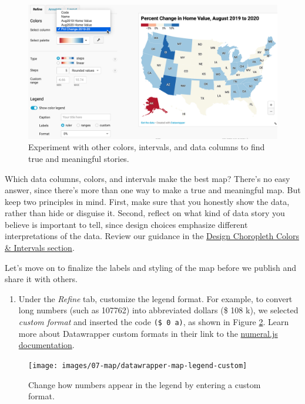 \documentclass[
  english,
]{book}
\providecommand{\tightlist}{%
  \setlength{\itemsep}{0pt}\setlength{\parskip}{0pt}}
\begin{document}
\begin{figure}
\includegraphics[width=650px]{images/07-map/datawrapper-map-percentchange} \caption{Experiment with other colors, intervals, and data columns to find true and meaningful stories.}\label{fig:datawrapper-map-percentchange}
\end{figure}

Which data columns, colors, and intervals make the best map? There's no easy answer, since there's more than one way to make a true and meaningful map. But keep two principles in mind. First, make sure that you honestly show the data, rather than hide or disguise it. Second, reflect on what kind of data story you believe is important to tell, since design choices emphasize different interpretations of the data. Review our guidance in the \href{design-choropleth.html}{Design Choropleth Colors \& Intervals section}.

Let's move on to finalize the labels and styling of the map before we publish and share it with others.

\begin{enumerate}
\def\labelenumi{\arabic{enumi}.}
\setcounter{enumi}{11}
\tightlist
\item
  Under the \emph{Refine} tab, customize the legend format. For example, to convert long numbers (such as 107762) into abbreviated dollars (\$ 108 k), we selected \emph{custom format} and inserted the code \texttt{(\$\ 0\ a)}, as shown in Figure \ref{fig:datawrapper-map-legend-custom}. Learn more about Datawrapper custom formats in their link to the \href{http://numeraljs.com/\#format}{numeral.js documentation}.
\end{enumerate}



\begin{figure}
\texttt{[image: images/07-map/datawrapper-map-legend-custom]} \caption{Change how numbers appear in the legend by entering a custom format.}\label{fig:datawrapper-map-legend-custom}
\end{figure}
\end{document}
